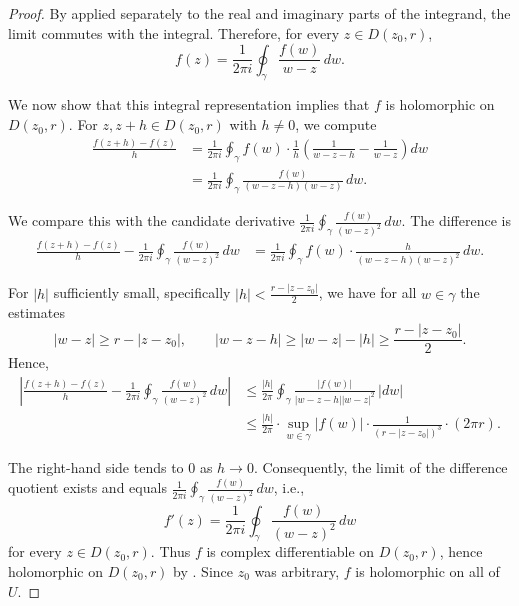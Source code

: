 \begin{proof}
    By  applied separately to the real and imaginary parts of the integrand, the limit commutes with the integral. Therefore, for every $z \in D(z_0, r)$,
    $$f(z) = \frac{1}{2\pi i} \oint_{\gamma} \frac{f(w)}{w - z}\,dw.$$

    We now show that this integral representation implies that $f$ is holomorphic on $D(z_0, r)$. For $z, z + h \in D(z_0, r)$ with $h \neq 0$, we compute
    \begin{align*}
        \frac{f(z + h) - f(z)}{h}
        &= \frac{1}{2\pi i} \oint_{\gamma} f(w) \cdot \frac{1}{h}\left( \frac{1}{w - z - h} - \frac{1}{w - z} \right) dw \\
        &= \frac{1}{2\pi i} \oint_{\gamma} \frac{f(w)}{(w - z - h)(w - z)}\,dw.
    \end{align*}

    We compare this with the candidate derivative $\frac{1}{2\pi i} \oint_{\gamma} \frac{f(w)}{(w - z)^2}\,dw$. The difference is
    \begin{align*}
        \frac{f(z + h) - f(z)}{h} - \frac{1}{2\pi i} \oint_{\gamma} \frac{f(w)}{(w - z)^2}\,dw
        &= \frac{1}{2\pi i} \oint_{\gamma} f(w) \cdot \frac{h}{(w - z - h)(w - z)^2}\,dw.
    \end{align*}

    For $|h|$ sufficiently small, specifically $|h| < \frac{r - |z - z_0|}{2}$, we have for all $w \in \gamma$ the estimates
    $$|w - z| \ge r - |z - z_0|, \qquad |w - z - h| \ge |w - z| - |h| \ge \frac{r - |z - z_0|}{2}.$$
    Hence,
    \begin{align*}
        \left|\frac{f(z + h) - f(z)}{h} - \frac{1}{2\pi i} \oint_{\gamma} \frac{f(w)}{(w - z)^2}\,dw\right|
        &\le \frac{|h|}{2\pi} \oint_{\gamma} \frac{|f(w)|}{|w - z - h||w - z|^2}\,|dw| \\
        &\le \frac{|h|}{2\pi} \cdot \sup_{w \in \gamma} |f(w)| \cdot \frac{1}{(r - |z - z_0|)^3} \cdot (2\pi r).
    \end{align*}

    The right-hand side tends to $0$ as $h \to 0$. Consequently, the limit of the difference quotient exists and equals $\frac{1}{2\pi i} \oint_{\gamma} \frac{f(w)}{(w - z)^2}\,dw$, i.e.,
    $$f'(z) = \frac{1}{2\pi i} \oint_{\gamma} \frac{f(w)}{(w - z)^2}\,dw$$
    for every $z \in D(z_0, r)$. Thus $f$ is complex differentiable on $D(z_0, r)$, hence holomorphic on $D(z_0, r)$ by . Since $z_0$ was arbitrary, $f$ is holomorphic on all of $U$.


\end{proof}

